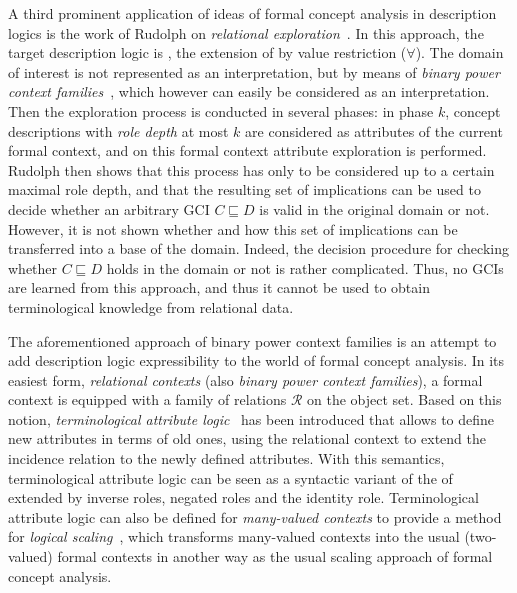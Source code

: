 A third prominent application of ideas of formal concept analysis in description logics is
the work of Rudolph on \emph{relational
  exploration}~\cite{phd/de/Rudolph2006,conf/iccs/Rudolph04}.  In this approach, the
target description logic is \FLE, the extension of \EL by value restriction ($\forall$).
The domain of interest is not represented as an interpretation, but by means of
\emph{binary power context families}~\cite{DBLP:conf/iccs/PredigerW99}, which however can
easily be considered as an interpretation.  Then the exploration process is conducted in
several phases: in phase $k$, concept descriptions with \emph{role depth} at most $k$ are
considered as attributes of the current formal context, and on this formal context
attribute exploration is performed.  Rudolph then shows that this process has only to be
considered up to a certain maximal role depth, and that the resulting set of implications
can be used to decide whether an arbitrary GCI $C \sqsubseteq D$ is valid in the original
domain or not.  However, it is not shown whether and how this set of implications can be
transferred into a base of the domain.  Indeed, the decision procedure for checking
whether $C \sqsubseteq D$ holds in the domain or not is rather complicated.  Thus, no GCIs
are learned from this approach, and thus it cannot be used to obtain terminological
knowledge from relational data.

The aforementioned approach of binary power context families is an attempt to add
description logic expressibility to the world of formal concept analysis.  In its easiest
form, \emph{relational contexts} (also \emph{binary power context families}), a formal
context is equipped with a family of relations $\mathcal{R}$ on the object set.  Based on
this notion, \emph{terminological attribute logic}~\cite{books/math/Prediger00} has been
introduced that allows to define new attributes in terms of old ones, using the relational
context to extend the incidence relation to the newly defined attributes.  With this
semantics, terminological attribute logic can be seen as a syntactic variant of the of
\ALC extended by inverse roles, negated roles and the identity role.  Terminological
attribute logic can also be defined for \emph{many-valued contexts} to provide a method
for \emph{logical scaling}~\cite{conf/krdb/PredigerS99}, which transforms many-valued
contexts into the usual (two-valued) formal contexts in another way as the usual scaling
approach of formal concept analysis.

